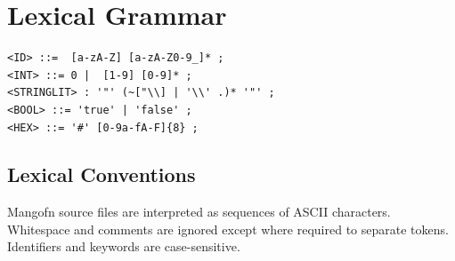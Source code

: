 \documentclass{article}
\begin{document}
\section{Lexical Grammar}
\begin{lstlisting}[language={},caption={Lexical rules}]
<ID> ::=  [a-zA-Z] [a-zA-Z0-9_]* ;
<INT> ::= 0 |  [1-9] [0-9]* ;
<STRINGLIT> : '"' (~["\\] | '\\' .)* '"' ;
<BOOL> ::= 'true' | 'false' ;
<HEX> ::= '#' [0-9a-fA-F]{8} ;
\end{lstlisting}

\subsection{Lexical Conventions}
Mangofn source files are interpreted as sequences of ASCII characters. Whitespace and comments are ignored except where required to separate tokens. Identifiers and keywords are case-sensitive. 
\end{document}
